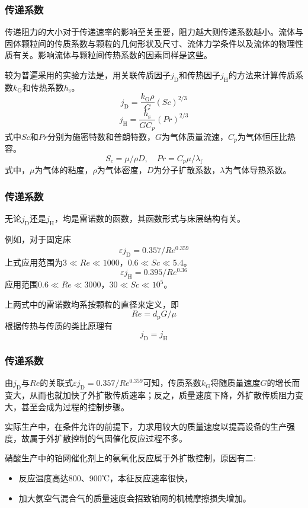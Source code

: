 \begin{frame}
    \frametitle{传递系数}

    传递阻力的大小对于传递速率的影响至关重要，阻力越大则传递系数越小。流体与固体颗粒间的传质系数与颗粒的几何形状及尺寸、流体力学条件以及流体的物理性质有关。影响流体与颗粒间传热系数的因素同样是这些。
    
    较为普遍采用的实验方法是，用关联传质因子$j_{\mathrm{D}}$和传热因子$j_{\mathrm{H}}$的方法来计算传质系数$k_{\mathrm{G}}$和传热系数$h_{\mathrm{s}}$。
    \[
        j_{\mathrm{D}}=\frac{k_{\mathrm{G}} \rho}{G}(S c)^{2 / 3}
    \]
    \[
        j_{\mathrm{H}}=\frac{h_{\mathrm{s}}}{G C_{p}}(P r)^{2 / 3}
    \]
    式中$Sc$和$Pr$分别为施密特数和普朗特数，$G$为气体质量流速，$C_{p}$为气体恒压比热容。
    \[
        S_{c}=\mu / \rho D, \quad P r=C_{p} \mu / \lambda_{\mathrm{f}}
    \]
    式中，$\mu$为气体的粘度，$\rho$为气体密度，$D$为分子扩散系数，$\lambda$为气体导热系数。

\end{frame}


\begin{frame}
    \frametitle{传递系数}

    无论$j_\mathrm{D}$还是$j_\mathrm{H}$，均是雷诺数的函数，其函数形式与床层结构有关。
    
    例如，对于固定床
    \[
        \varepsilon j_{\mathrm{D}}=0.357 / R e^{0.359}
    \]
    上式应用范围为$3 \ll Re \ll 1000$，$0.6 \ll Sc \ll 5.4$。
    \[
        \varepsilon j_{\mathrm{H}}=0.395 / R e^{0.36}
    \]
    应用范围$0.6 \ll Re \ll 3000$，$30 \ll Sc \ll 10^5$。

    上两式中的雷诺数均系按颗粒的直径来定义，即
    \[
        R e=d_{\mathrm{p}} G / \mu
    \]
    根据传热与传质的类比原理有
    \[
        j_{\mathrm{D}}=j_{\mathrm{H}}
    \]

\end{frame}


\begin{frame}
    \frametitle{传递系数}

    由$j_{\mathrm{D}}$与$Re$的关联式$\varepsilon j_{\mathrm{D}}=0.357 / R e^{0.359}$可知，传质系数$k_\mathrm{G}$将随质量速度$G$的增长而变大，从而也就加快了外扩散传质速率；反之，质量速度下降，外扩散传质阻力变大，甚至会成为过程的控制步骤。

    实际生产中，在条件允许的前提下，力求用较大的质量速度以提高设备的生产强度，故属于外扩散控制的气固催化反应过程不多。
    
    硝酸生产中的铂网催化剂上的氨氧化反应属于外扩散控制，原因有二:
    \begin{itemize}
        \item 反应温度高达800、900℃，本征反应速率很快，
        \item 加大氨空气混合气的质量速度会招致铂网的机械摩擦损失增加。
    \end{itemize}

\end{frame}


